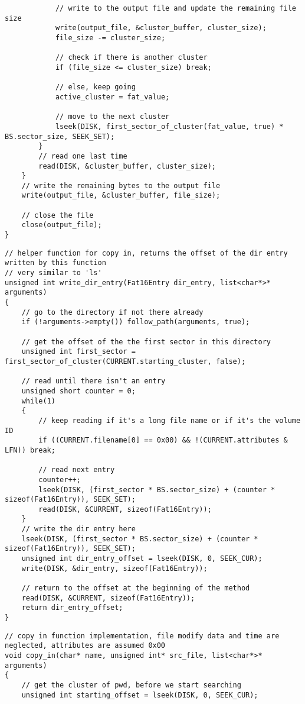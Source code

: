 \documentclass[12pt,letter,titlepage]{article}
\begin{document}
{{\begin{verbatim}
			// write to the output file and update the remaining file size
			write(output_file, &cluster_buffer, cluster_size);
			file_size -= cluster_size;

			// check if there is another cluster
			if (file_size <= cluster_size) break;

			// else, keep going
			active_cluster = fat_value;

			// move to the next cluster
			lseek(DISK, first_sector_of_cluster(fat_value, true) * BS.sector_size, SEEK_SET);
		}
		// read one last time
		read(DISK, &cluster_buffer, cluster_size);
	}
	// write the remaining bytes to the output file
	write(output_file, &cluster_buffer, file_size);

	// close the file
	close(output_file);
}
\end{verbatim}
\pagebreak
\begin{verbatim}
// helper function for copy in, returns the offset of the dir entry written by this function
// very similar to 'ls'
unsigned int write_dir_entry(Fat16Entry dir_entry, list<char*>* arguments)
{
	// go to the directory if not there already
	if (!arguments->empty()) follow_path(arguments, true);

	// get the offset of the the first sector in this directory
	unsigned int first_sector = first_sector_of_cluster(CURRENT.starting_cluster, false);

	// read until there isn't an entry
	unsigned short counter = 0;
	while(1)
	{
		// keep reading if it's a long file name or if it's the volume ID
		if ((CURRENT.filename[0] == 0x00) && !(CURRENT.attributes & LFN)) break;

		// read next entry
		counter++;
		lseek(DISK, (first_sector * BS.sector_size) + (counter * sizeof(Fat16Entry)), SEEK_SET);
		read(DISK, &CURRENT, sizeof(Fat16Entry));
	}
	// write the dir entry here
	lseek(DISK, (first_sector * BS.sector_size) + (counter * sizeof(Fat16Entry)), SEEK_SET);
	unsigned int dir_entry_offset = lseek(DISK, 0, SEEK_CUR);
	write(DISK, &dir_entry, sizeof(Fat16Entry));

	// return to the offset at the beginning of the method
	read(DISK, &CURRENT, sizeof(Fat16Entry));
	return dir_entry_offset;
}
\end{verbatim}
\pagebreak
\begin{verbatim}
// copy in function implementation, file modify data and time are neglected, attributes are assumed 0x00
void copy_in(char* name, unsigned int* src_file, list<char*>* arguments)
{
	// get the cluster of pwd, before we start searching
	unsigned int starting_offset = lseek(DISK, 0, SEEK_CUR);


\end{verbatim}}}
\end{document}
